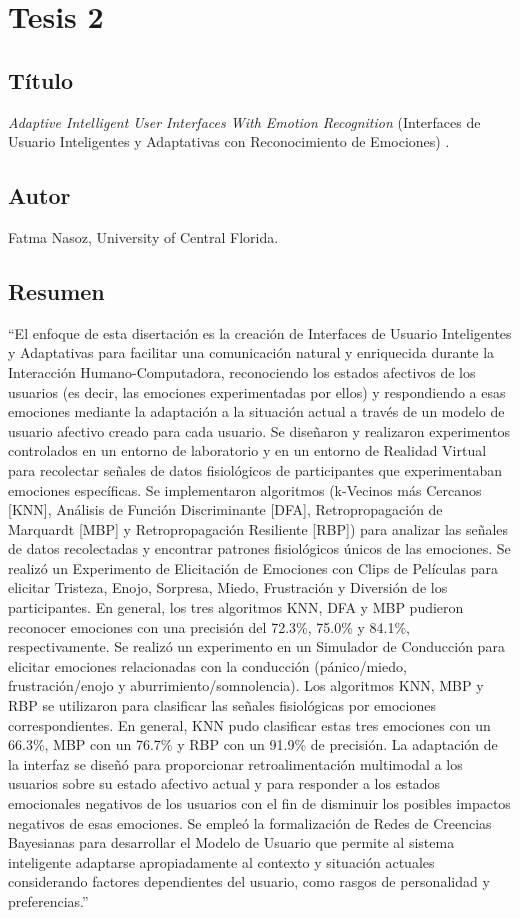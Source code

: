\section{Tesis 2}

\subsection{Título}
\textit{Adaptive Intelligent User Interfaces With Emotion Recognition} (Interfaces de Usuario Inteligentes y Adaptativas con Reconocimiento de Emociones) \cite{nasoz2004}.

\subsection{Autor}
Fatma Nasoz, University of Central Florida.

\subsection{Resumen}
``El enfoque de esta disertación es la creación de Interfaces de Usuario Inteligentes y Adaptativas para facilitar una comunicación natural y enriquecida durante la Interacción Humano-Computadora, reconociendo los estados afectivos de los usuarios (es decir, las emociones experimentadas por ellos) y respondiendo a esas emociones mediante la adaptación a la situación actual a través de un modelo de usuario afectivo creado para cada usuario. Se diseñaron y realizaron experimentos controlados en un entorno de laboratorio y en un entorno de Realidad Virtual para recolectar señales de datos fisiológicos de participantes que experimentaban emociones específicas. Se implementaron algoritmos (k-Vecinos más Cercanos [KNN], Análisis de Función Discriminante [DFA], Retropropagación de Marquardt [MBP] y Retropropagación Resiliente [RBP]) para analizar las señales de datos recolectadas y encontrar patrones fisiológicos únicos de las emociones. Se realizó un Experimento de Elicitación de Emociones con Clips de Películas para elicitar Tristeza, Enojo, Sorpresa, Miedo, Frustración y Diversión de los participantes. En general, los tres algoritmos KNN, DFA y MBP pudieron reconocer emociones con una precisión del 72.3\%, 75.0\% y 84.1\%, respectivamente. Se realizó un experimento en un Simulador de Conducción para elicitar emociones relacionadas con la conducción (pánico/miedo, frustración/enojo y aburrimiento/somnolencia). Los algoritmos KNN, MBP y RBP se utilizaron para clasificar las señales fisiológicas por emociones correspondientes. En general, KNN pudo clasificar estas tres emociones con un 66.3\%, MBP con un 76.7\% y RBP con un 91.9\% de precisión. La adaptación de la interfaz se diseñó para proporcionar retroalimentación multimodal a los usuarios sobre su estado afectivo actual y para responder a los estados emocionales negativos de los usuarios con el fin de disminuir los posibles impactos negativos de esas emociones. Se empleó la formalización de Redes de Creencias Bayesianas para desarrollar el Modelo de Usuario que permite al sistema inteligente adaptarse apropiadamente al contexto y situación actuales considerando factores dependientes del usuario, como rasgos de personalidad y preferencias.'' \cite{nasoz2004}


